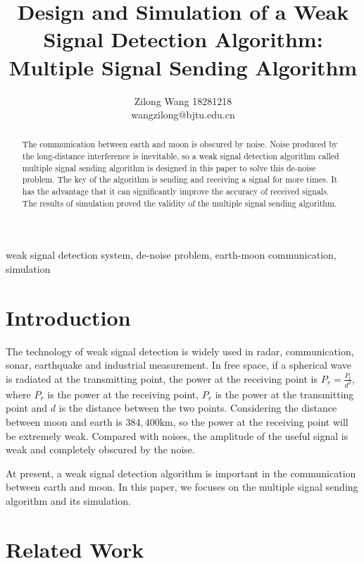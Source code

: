 \documentclass[conference]{IEEEtran}
\begin{document}
\title{Design and Simulation of a Weak Signal Detection Algorithm: Multiple Signal Sending Algorithm}
\author{Zilong Wang 18281218\\wangzilong@bjtu.edu.cn
 }


\maketitle
\begin{abstract}
The communication between earth and moon is obscured by noise. Noise produced by the long-distance interference is inevitable, so a weak signal detection algorithm called multiple signal sending algorithm is designed in this paper to solve this de-noise problem. The key of the algorithm is sending and receiving a signal for more times. It has the advantage that it can significantly improve the accuracy of received signals. The results of simulation proved the validity of the multiple signal sending algorithm.
\end{abstract}

\begin{IEEEkeywords}
weak signal detection system, de-noise problem, earth-moon communication, simulation
\end{IEEEkeywords}


\section{Introduction}
The technology of weak signal detection is widely used in radar, communication, sonar, earthquake and industrial measurement\cite{b1}. In free space, if a spherical wave is radiated at the transmitting point, the power at the receiving point is $P_r=\frac{P_t}{d^2}$, where $P_r$ is the power at the receiving point, $P_r$ is the power at the transmitting point and $d$ is the distance between the two points. Considering the distance between moon and earth is $384,400$km, so the power at the receiving point will be extremely weak. Compared with noises, the amplitude of the useful signal is weak and completely obscured by the noise\cite{b2}.

At present, a weak signal detection algorithm is important in the communication between earth and moon. In this paper, we focuses on the multiple signal sending algorithm and its simulation.



\section{Related Work}
\end{document}
